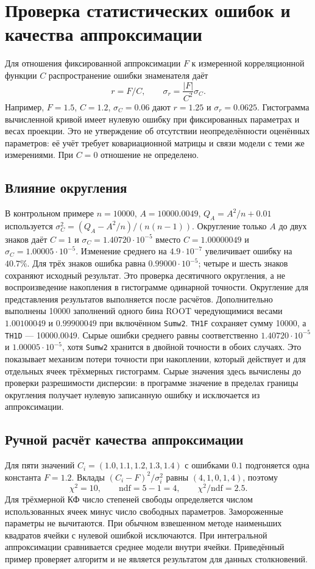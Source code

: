 \section*{Проверка статистических ошибок и качества аппроксимации}
Для отношения фиксированной аппроксимации $F$ к измеренной корреляционной
функции $C$ распространение ошибки знаменателя даёт
\[
    r=F/C,\qquad \sigma_r=\frac{|F|}{C^2}\sigma_C.
\]
Например, $F=1.5$, $C=1.2$, $\sigma_C=0.06$ дают $r=1.25$ и
$\sigma_r=0.0625$. Гистограмма вычисленной кривой имеет нулевую ошибку
при фиксированных параметрах и весах проекции. Это не утверждение
об отсутствии неопределённости оценённых параметров: её учёт требует
ковариационной матрицы и связи модели с теми же измерениями.
При $C=0$ отношение не определено.

\subsection*{Влияние округления}
В контрольном примере $n=10000$, $A=10000.0049$,
$Q_A=A^2/n+0.01$ используется
$\sigma_C^2=(Q_A-A^2/n)/(n(n-1))$.
Округление только $A$ до двух знаков даёт $C=1$ и
$\sigma_C=1.40720\cdot10^{-5}$ вместо $C=1.00000049$ и
$\sigma_C=1.00005\cdot10^{-5}$.
Изменение среднего на $4.9\cdot10^{-7}$ увеличивает ошибку на $40.7\%$.
Для трёх знаков ошибка равна $0.99000\cdot10^{-5}$; четыре и шесть
знаков сохраняют исходный результат. Это проверка десятичного округления,
а не воспроизведение накопления в гистограмме одинарной точности.
Округление для представления результатов выполняется после расчётов.
Дополнительно выполнены 10000 заполнений одного бина ROOT чередующимися
весами $1.00100049$ и $0.99900049$ при включённом \texttt{Sumw2}.
\texttt{TH1F} сохраняет сумму 10000, а \texttt{TH1D} --- 10000.0049.
Сырые ошибки среднего равны соответственно $1.40720\cdot10^{-5}$
и $1.00005\cdot10^{-5}$, хотя \texttt{Sumw2} хранится в двойной точности
в обоих случаях. Это показывает механизм потери точности при накоплении,
который действует и для отдельных ячеек трёхмерных гистограмм.
Сырые значения здесь вычислены до проверки разрешимости дисперсии:
в программе значение в пределах границы округления получает нулевую
записанную ошибку и исключается из аппроксимации.

\subsection*{Ручной расчёт качества аппроксимации}
Для пяти значений $C_i=(1.0,1.1,1.2,1.3,1.4)$ с ошибками $0.1$
подгоняется одна константа $F=1.2$. Вклады
$(C_i-F)^2/\sigma_i^2$ равны $(4,1,0,1,4)$, поэтому
\[
    \chi^2=10,\qquad \mathrm{ndf}=5-1=4,\qquad
    \chi^2/\mathrm{ndf}=2.5.
\]
Для трёхмерной КФ число степеней свободы определяется числом
использованных ячеек минус число свободных параметров.
Замороженные параметры не вычитаются. При обычном взвешенном
методе наименьших квадратов ячейки с нулевой ошибкой исключаются.
При интегральной аппроксимации сравнивается среднее модели внутри ячейки.
Приведённый пример проверяет алгоритм и не является результатом
для данных столкновений.

